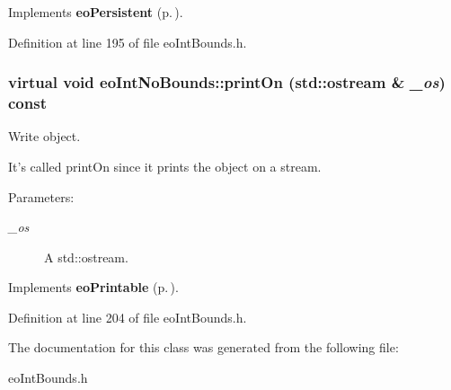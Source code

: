 Implements {\bf eo\-Persistent} {\rm (p.\,\pageref{classeo_persistent_a1})}.

Definition at line 195 of file eo\-Int\-Bounds.h.
\subsubsection{\setlength{\rightskip}{0pt plus 5cm}virtual void eo\-Int\-No\-Bounds::print\-On (std::ostream \& {\em \_\-os}) const\hspace{0.3cm}{\tt  [inline, virtual]}}\label{classeo_int_no_bounds_a14}


Write object. 

It's called print\-On since it prints the object on a stream. \begin{Desc}
\item[Parameters:]
\begin{description}
\item[{\em \_\-os}]A std::ostream. \end{description}
\end{Desc}


Implements {\bf eo\-Printable} {\rm (p.\,\pageref{classeo_printable_a1})}.

Definition at line 204 of file eo\-Int\-Bounds.h.

The documentation for this class was generated from the following file:\begin{CompactItemize}
\item 
eo\-Int\-Bounds.h\end{CompactItemize}
